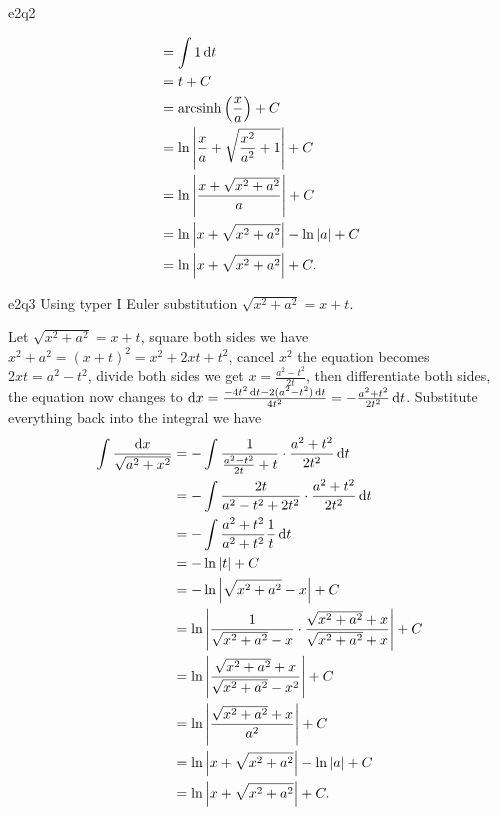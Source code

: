 \documentclass[reqno]{alittlebear}
\begin{document}
\begin{exercise}{}{}
\begin{question}{}{e2q2}
\begin{mathnote}
\begin{align*}
                &=\int 1\mathop{}\!\mathrm{d} t\\
                &=t+C\\ 
                &=\operatorname{arcsinh}\left(\frac{x}{a}\right)+C\\
                &=\ln\left|\frac{x}{a}+\sqrt{\frac{x^2}{a^2}+1}\right|+C\\
                &=\ln\left|\frac{x+\sqrt{x^2+a^2}}{a}\right|+C\\
                &=\ln\left|x+\sqrt{x^2+a^2}\right|-\ln\left|a\right|+C\\
                &=\ln\left|x+\sqrt{x^2+a^2}\right|+C.\\
            \end{align*}
        \end{mathnote}
    \end{question}
    \begin{question}{}{e2q3}
        Using typer I Euler substitution $\sqrt{x^2+a^2}=x+t$.
        \qbreak
        \begin{mathnote}
            Let $\sqrt{x^2+a^2}=x+t$, square both sides we have $x^2+a^2=(x+t)^2=x^2+2xt+t^2$, cancel $x^2$ the equation becomes $2xt=a^2-t^2$, divide both sides we get $x=\frac{a^2-t^2}{2t}$, then differentiate both sides, the equation now changes to $\mathop{}\!\mathrm{d} x = \frac{-4t^2\mathop{}\!\mathrm{d} t - 2(a^2-t^2)\mathop{}\!\mathrm{d} t}{4t^2}=-\frac{a^2+t^2}{2t^2}\mathop{}\!\mathrm{d} t$. Substitute everything back into the integral we have \begin{align*}
                \int \frac{\mathop{}\!\mathrm{d} x}{\sqrt{a^2+x^2}} &= -\int \frac{1}{\frac{a^2-t^2}{2t}+t}\cdot\frac{a^2+t^2}{2t^2}\mathop{}\!\mathrm{d} t\\
                &=-\int \frac{2t}{a^2-t^2+2t^2}\cdot\frac{a^2+t^2}{2t^2}\mathop{}\!\mathrm{d} t\\
                &=-\int \frac{a^2+t^2}{a^2+t^2}\frac{1}{t}\mathop{}\!\mathrm{d} t\\
                &=-\ln\left|t\right|+C\\
                &=-\ln\left|\sqrt{x^2+a^2}-x\right|+C\\
                &=\ln\left|\frac1{\sqrt{x^2+a^2}-x}\cdot\frac{\sqrt{x^2+a^2}+x}{\sqrt{x^2+a^2}+x}\right|+C\\
                &=\ln\left|\frac{\sqrt{x^2+a^2}+x}{\sqrt{x^2+a^2}-x^2}\right|+C\\
                &=\ln\left|\frac{\sqrt{x^2+a^2}+x}{a^2}\right|+C\\
                &=\ln\left|x+\sqrt{x^2+a^2}\right|-\ln\left|a\right|+C\\
                &=\ln\left|x+\sqrt{x^2+a^2}\right|+C.\\
            \end{align*}
        \end{mathnote}
    \end{question}


\end{exercise}
\end{document}
